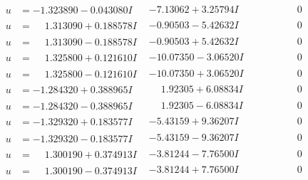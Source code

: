 \documentclass[1p]{elsarticle_modified}
\theoremstyle{definition}
\begin{document}
$$\begin{array}{c|c|c}
 \hline 
\begin{aligned}
u &= -1.323890 - 0.043080 I\end{aligned}
 & -7.13062 + 3.25794 I & \phantom{-0.000000 } 0 \\ \hline\begin{aligned}
u &= \phantom{-}1.313090 + 0.188578 I\end{aligned}
 & -0.90503 - 5.42632 I & \phantom{-0.000000 } 0 \\ \hline\begin{aligned}
u &= \phantom{-}1.313090 - 0.188578 I\end{aligned}
 & -0.90503 + 5.42632 I & \phantom{-0.000000 } 0 \\ \hline\begin{aligned}
u &= \phantom{-}1.325800 + 0.121610 I\end{aligned}
 & -10.07350 - 3.06520 I & \phantom{-0.000000 } 0 \\ \hline\begin{aligned}
u &= \phantom{-}1.325800 - 0.121610 I\end{aligned}
 & -10.07350 + 3.06520 I & \phantom{-0.000000 } 0 \\ \hline\begin{aligned}
u &= -1.284320 + 0.388965 I\end{aligned}
 & \phantom{-}1.92305 + 6.08834 I & \phantom{-0.000000 } 0 \\ \hline\begin{aligned}
u &= -1.284320 - 0.388965 I\end{aligned}
 & \phantom{-}1.92305 - 6.08834 I & \phantom{-0.000000 } 0 \\ \hline\begin{aligned}
u &= -1.329320 + 0.183577 I\end{aligned}
 & -5.43159 + 9.36207 I & \phantom{-0.000000 } 0 \\ \hline\begin{aligned}
u &= -1.329320 - 0.183577 I\end{aligned}
 & -5.43159 - 9.36207 I & \phantom{-0.000000 } 0 \\ \hline\begin{aligned}
u &= \phantom{-}1.300190 + 0.374913 I\end{aligned}
 & -3.81244 - 7.76500 I & \phantom{-0.000000 } 0 \\ \hline\begin{aligned}
u &= \phantom{-}1.300190 - 0.374913 I\end{aligned}
 & -3.81244 + 7.76500 I & \phantom{-0.000000 } 0 \\ \hline\begin{aligned}

\end{aligned}
\end{array}$$
\end{document}

